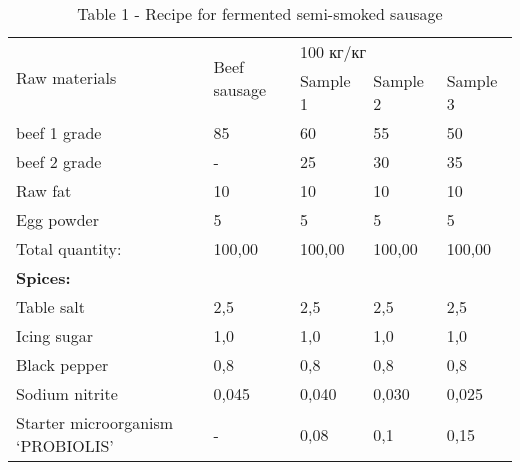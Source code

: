 \begin{table}[H]
\caption*{Table 1 - Recipe for fermented semi-smoked sausage}
\centering
\begin{tabular}{|l|l|lll|}
\hline
\multirow{2}{*}{Raw materials}    & \multirow{2}{*}{Beef sausage} & \multicolumn{3}{l|}{100 кг/кг}                                           \\ \cline{3-5} 
                                  &                               & \multicolumn{1}{l|}{Sample 1} & \multicolumn{1}{l|}{Sample 2} & Sample 3 \\ \hline
beef 1 grade                      & 85                            & \multicolumn{1}{l|}{60}       & \multicolumn{1}{l|}{55}       & 50       \\ \hline
beef 2 grade                      & -                             & \multicolumn{1}{l|}{25}       & \multicolumn{1}{l|}{30}       & 35       \\ \hline
Raw fat                           & 10                            & \multicolumn{1}{l|}{10}       & \multicolumn{1}{l|}{10}       & 10       \\ \hline
Egg powder                        & 5                             & \multicolumn{1}{l|}{5}        & \multicolumn{1}{l|}{5}        & 5        \\ \hline
Total quantity:                   & 100,00                        & \multicolumn{1}{l|}{100,00}   & \multicolumn{1}{l|}{100,00}   & 100,00   \\ \hline
\textbf{Spices:}                  &                               & \multicolumn{1}{l|}{}         & \multicolumn{1}{l|}{}         &          \\ \hline
Table salt                        & 2,5                           & \multicolumn{1}{l|}{2,5}      & \multicolumn{1}{l|}{2,5}      & 2,5      \\ \hline
Icing sugar                       & 1,0                           & \multicolumn{1}{l|}{1,0}      & \multicolumn{1}{l|}{1,0}      & 1,0      \\ \hline
Black pepper                      & 0,8                           & \multicolumn{1}{l|}{0,8}      & \multicolumn{1}{l|}{0,8}      & 0,8      \\ \hline
Sodium nitrite                    & 0,045                         & \multicolumn{1}{l|}{0,040}    & \multicolumn{1}{l|}{0,030}    & 0,025    \\ \hline
Starter microorganism ‘PROBIOLIS’ & -                             & \multicolumn{1}{l|}{0,08}     & \multicolumn{1}{l|}{0,1}      & 0,15     \\ \hline
\end{tabular}
\end{table}

